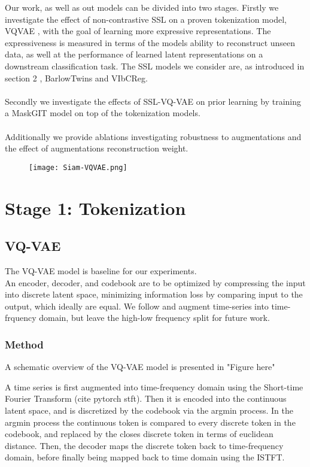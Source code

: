 \documentclass[../../thesis.tex]{subfiles}
\begin{document}
Our work, as well as out models can be divided into two stages. Firstly we investigate the effect of non-contrastive SSL on a proven tokenization model, VQVAE \cite{VQVAE}, with the goal of learning more expressive representations. The expressiveness is measured in terms of the models ability to reconstruct unseen data, as well at the performance of learned latent representations on a downstream classification task. The SSL models we consider are, as introduced in section 2 , BarlowTwins and VIbCReg.\\\\

Secondly we investigate the effects of SSL-VQ-VAE on prior learning by training a MaskGIT model on top of the tokenization models.\\\\

Additionally we provide ablations investigating robustness to augmentations and the effect of augmentations reconstruction weight. 




\begin{figure}[h]
    \texttt{[image: Siam-VQVAE.png]}
    \centering    
\end{figure}


\section{Stage 1: Tokenization}


\subsection{VQ-VAE}
The VQ-VAE model is baseline for our experiments.\\

An encoder, decoder, and codebook are to be optimized by compressing the input into discrete latent space, minimizing information loss by comparing input to the output, which ideally are equal. We follow \cite{TimeVQVAE} and augment time-series into time-frquency domain, but leave the high-low frequency split for future work.

\subsubsection{Method}
A schematic overview of the VQ-VAE model is presented in "Figure here"

A time series is first augmented into time-frequency domain using the Short-time Fourier Transform (cite pytorch stft). Then it is encoded into the continuous latent space, and is discretized by the codebook via the argmin process. In the argmin process the continuous token is compared to every discrete token in the codebook, and replaced by the closes discrete token in terms of euclidean distance. Then, the decoder maps the discrete token back to time-frequency domain, before finally being mapped back to time domain using the ISTFT.
\end{document}

